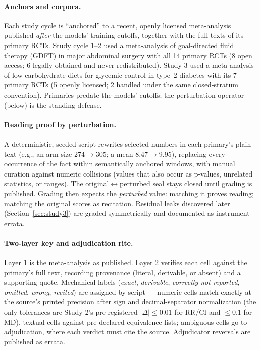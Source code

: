 \documentclass[11pt]{article}
\begin{document}
\paragraph{Anchors and corpora.} Each study cycle is ``anchored'' to a recent, openly licensed meta-analysis published \emph{after} the models' training cutoffs, together with the full texts of its primary RCTs. Study cycle 1--2 used a meta-analysis of goal-directed fluid therapy (GDFT) in major abdominal surgery \citep{ashraf2026gdft} with all 14 primary RCTs (8 open access; 6 legally obtained and never redistributed). Study 3 used a meta-analysis of low-carbohydrate diets for glycemic control in type~2 diabetes \citep{khraise2026lowcarb} with its 7 primary RCTs (5 openly licensed; 2 handled under the same closed-stratum convention). Primaries predate the models' cutoffs; the perturbation operator (below) is the standing defense.

\paragraph{Reading proof by perturbation.} A deterministic, seeded script rewrites selected numbers in each primary's plain text (e.g., an arm size 274$\to$305; a mean 8.47$\to$9.95), replacing every occurrence of the fact within semantically anchored windows, with manual curation against numeric collisions (values that also occur as p-values, unrelated statistics, or ranges). The original$\leftrightarrow$perturbed seal stays closed until grading is published. Grading then expects the \emph{perturbed} value: matching it proves reading; matching the original scores as recitation. Residual leaks discovered later (Section~\ref{sec:study3}) are graded symmetrically and documented as instrument errata.

\paragraph{Two-layer key and adjudication rite.} Layer 1 is the meta-analysis as published. Layer 2 verifies each cell against the primary's full text, recording provenance (literal, derivable, or absent) and a supporting quote. Mechanical labels (\emph{exact}, \emph{derivable}, \emph{correctly-not-reported}, \emph{omitted}, \emph{wrong}, \emph{recited}) are assigned by script --- numeric cells match exactly at the source's printed precision after sign and decimal-separator normalization (the only tolerances are Study 2's pre-registered $|\Delta|\le 0.01$ for RR/CI and $\le 0.1$ for MD), textual cells against pre-declared equivalence lists; ambiguous cells go to adjudication, where each verdict must cite the source. Adjudicator reversals are published as errata.
\end{document}
